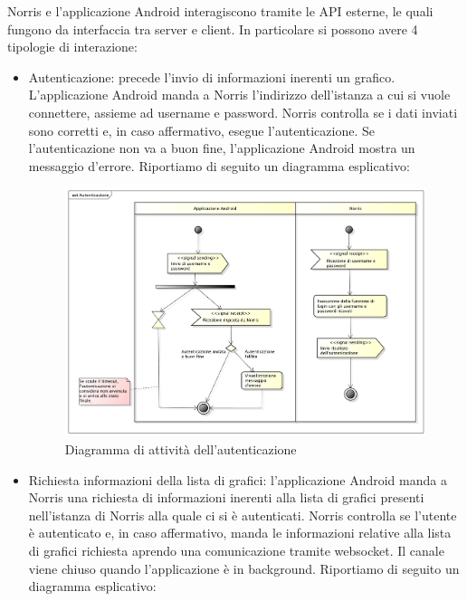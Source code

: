         Norris e l'applicazione Android interagiscono tramite le API esterne, le quali fungono da interfaccia tra server e client. In particolare si possono avere 4 tipologie di interazione:
        \begin{itemize}
            \item Autenticazione: precede l'invio di informazioni inerenti un grafico. L'applicazione Android manda a Norris l'indirizzo dell'istanza a cui si vuole connettere, assieme ad username e password. Norris controlla se i dati inviati sono corretti e, in caso affermativo, esegue l'autenticazione. Se l'autenticazione non va a buon fine, l'applicazione Android mostra un messaggio d'errore. Riportiamo di seguito un diagramma esplicativo:
        	\begin{figure}[H]\centering
        		\includegraphics[width=\textwidth]{SpecificaTecnica/Pics/Applicazione/Autenticazione.pdf}
        		\caption{Diagramma di attività dell'autenticazione}
    		\end{figure}
            \item Richiesta informazioni della lista di grafici: l'applicazione Android manda a Norris una richiesta di informazioni inerenti alla lista di grafici presenti nell'istanza di Norris alla quale ci si è autenticati. Norris controlla se l'utente è autenticato e, in caso affermativo, manda le informazioni relative alla lista di grafici richiesta aprendo una comunicazione tramite websocket. Il canale viene chiuso quando l'applicazione è in background. Riportiamo di seguito un diagramma esplicativo:
            \begin{figure}[H]\centering

\end{figure}
\end{itemize}
